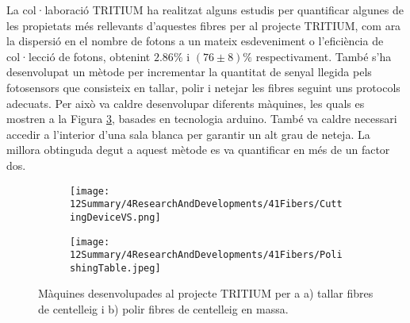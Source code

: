 La col·laboració TRITIUM ha realitzat alguns estudis per quantificar algunes de les propietats més rellevants d'aquestes fibres per al projecte TRITIUM, com ara la dispersió en el nombre de fotons a un mateix esdeveniment o l'eficiència de col·lecció de fotons, obtenint $2.86\%$ i $(76 \pm 8)\%$ respectivament. També s'ha desenvolupat un mètode per incrementar la quantitat de senyal llegida pels fotosensors que consisteix en tallar, polir i netejar les fibres seguint uns protocols adecuats. Per això va caldre desenvolupar diferents màquines, les quals es mostren a la Figura \ref{fig:MaquinesTRITIUM}, basades en tecnologia arduino. També va caldre necessari accedir a l'interior d'una sala blanca per garantir un alt grau de neteja. La millora obtinguda degut a aquest mètode es va quantificar en més de un factor dos. 

\begin{figure}
\centering
    \begin{subfigure}[b]{0.5\textwidth}
    \centering
    \texttt{[image: 12Summary/4ResearchAndDevelopments/41Fibers/CuttingDeviceVS.png]}  
    \caption{\label{subfig:MaquinaTallar}}
    \end{subfigure}
    \hfill
    \begin{subfigure}[b]{0.45\textwidth}
    \centering
    \texttt{[image: 12Summary/4ResearchAndDevelopments/41Fibers/PolishingTable.jpeg]}  
    \caption{\label{subfig:MaquinaPolir}}
    \end{subfigure}
 \caption{Màquines desenvolupades al projecte TRITIUM per a a) tallar fibres de centelleig i b) polir fibres de centelleig en massa. \label{fig:MaquinesTRITIUM}}
\end{figure}